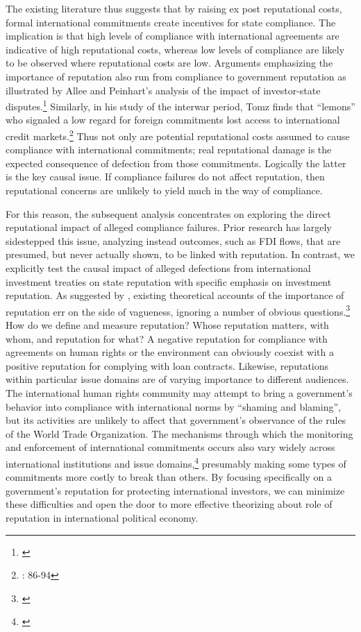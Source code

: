 \documentclass[12pt,onesided]{amsart}
\begin{document}
The existing literature thus suggests that by raising ex post reputational costs, formal international commitments create incentives for state compliance. The implication is that high levels of compliance with international agreements are indicative of high reputational costs, whereas low levels of compliance are likely to be observed where reputational costs are low. Arguments emphasizing the importance of reputation also run from compliance to government reputation as illustrated by Allee and Peinhart's analysis of the impact of investor-state disputes.\footnote{\citet{allee:peinhardt:2011}} Similarly, in his study of the interwar period, Tomz finds that ``lemons'' who signaled a low regard for foreign commitments lost access to international credit markets.\footnote{\citet{tomz:2007}: 86-94} Thus not only are potential reputational costs assumed to cause compliance with international commitments; real reputational damage is the expected consequence of defection from those commitments. Logically the latter is the key causal issue. If compliance failures do not affect reputation, then reputational concerns are unlikely to yield much in the way of compliance.

For this reason, the subsequent analysis concentrates on exploring the direct reputational impact of alleged compliance failures. Prior research has largely sidestepped this issue, analyzing instead outcomes, such as FDI flows, that are presumed, but never actually shown, to be linked with reputation. In contrast, we explicitly test the causal impact of alleged defections from international investment treaties on state reputation with specific emphasis on investment reputation. As suggested by \citeauthor{brewster:2009}, existing theoretical accounts of the importance of reputation err on the side of vagueness, ignoring a number of obvious questions.\footnote{\citet{brewster:2009}} How do we define and measure reputation? Whose reputation matters, with whom, and reputation for what? A negative reputation for compliance with agreements on human rights or the environment can obviously coexist with a positive reputation for complying with loan contracts. Likewise, reputations within particular issue domains are of varying importance to different audiences. The international human rights community may attempt to bring a government's behavior into compliance with international norms by ``shaming and blaming'', but its activities are unlikely to affect that government's observance of the rules of the World Trade Organization. The mechanisms through which the monitoring and enforcement of international commitments occurs also vary widely across international institutions and issue domains,\footnote{\citet{gaukordger:gordon:2012}} presumably making some types of commitments more costly to break than others. By focusing specifically on a government's reputation for protecting international investors, we can minimize these difficulties and open the door to more effective theorizing about role of reputation in international political economy.
\end{document}
